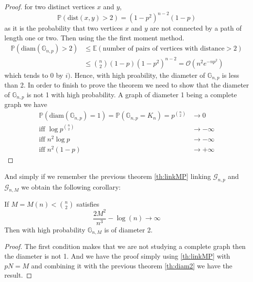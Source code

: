 \begin{proof}
	for two distinct vertices $x$ and $y$,
	\begin{equation}
		\mathbb{P}(\text{dist}(x, y) > 2) = (1-p^2)^{n-2}(1-p)
	\end{equation}
	as it is the probability that two vertices $x$ and $y$ are not connected by a path of length one or two.
	\newline
	Then using the the first moment method.
	\begin{align}
		\mathbb{P}(\text{diam}(\mathbb{G}_{n,p}) > 2) 	&\leq \mathbb{E}(\text{number of pairs of vertices with distance} > 2) \\
	&\leq \binom{n}{2}(1-p)(1-p^2)^{n-2} = \mathcal{O}(n^2e^{-np^2})
	\end{align}
	which tends to 0 by $i)$. Hence, with high proability, the diameter of $\mathbb{G}_{n,p}$ is less than 2. 
	In order to finish to prove the theorem we need to show that the diameter of $\mathbb{G}_{n,p}$ is not 1 with high probability.
	A graph of diameter 1 being a complete graph we have
	\begin{align}
		\mathbb{P}(\text{diam}(\mathbb{G}_{n,p}) = 1) = \mathbb{P}(\mathbb{G}_{n,p} = K_n) 	
				= p^{\binom{n}{2}} &\longrightarrow 0				\\
		\text{iff  } \log p^{\binom{n}{2}} &\longrightarrow -\infty			\\
			   \text{iff  } n^2 \log p &\longrightarrow -\infty			\\
	\text{iff  } n^2 (1-p) &\longrightarrow +\infty			
	\end{align}	
\end{proof}
And simply if we remember the previous theorem \eqref{th:linkMP} linking $\mathcal{G}_{n,p}$ and $\mathcal{G}_{n,M}$ we obtain the following corollary:
\begin{corollary}
	If $M=M(n) < \binom{n}{2}$ satisfies 
	\begin{equation}
		\frac{2M^2}{n^3} - \log(n) \longrightarrow \infty
	\end{equation}
	Then with high probability $\mathbb{G}_{n, M}$ is of diameter 2.
\end{corollary}
\begin{proof}
	The first condition makes that we are not studying a complete graph then the diameter is not 1.
	And we have the proof simply using \eqref{th:linkMP} with $pN = M$ and combining it with the previous theorem \eqref{th:diam2} we have the result.
\end{proof}

